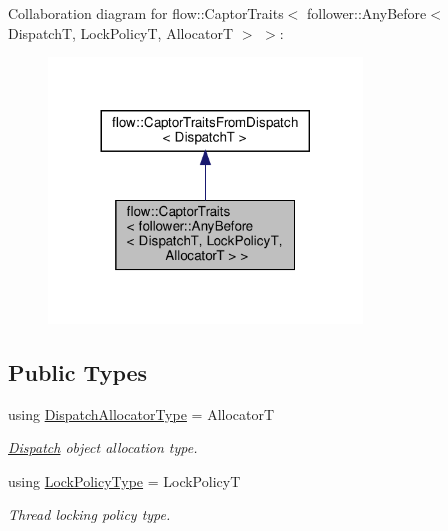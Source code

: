 Collaboration diagram for flow\+:\+:Captor\+Traits$<$ follower\+:\+:Any\+Before$<$ DispatchT, Lock\+PolicyT, AllocatorT $>$ $>$\+:\nopagebreak
\begin{figure}[H]
\begin{center}
\leavevmode
\includegraphics[width=236pt]{structflow_1_1_captor_traits_3_01follower_1_1_any_before_3_01_dispatch_t_00_01_lock_policy_t_00_2f7d1c83db67b38d8b297b11611292a1}
\end{center}
\end{figure}
\subsection*{Public Types}
\begin{DoxyCompactItemize}
\item 
\mbox{\label{structflow_1_1_captor_traits_3_01follower_1_1_any_before_3_01_dispatch_t_00_01_lock_policy_t_00_01_allocator_t_01_4_01_4_a3af70e51a0d14f66965be23affacd6e6}} 
using \hyperlink{structflow_1_1_captor_traits_3_01follower_1_1_any_before_3_01_dispatch_t_00_01_lock_policy_t_00_01_allocator_t_01_4_01_4_a3af70e51a0d14f66965be23affacd6e6}{Dispatch\+Allocator\+Type} = AllocatorT
\begin{DoxyCompactList}\small\item\em \hyperlink{classflow_1_1_dispatch}{Dispatch} object allocation type. \end{DoxyCompactList}\item 
\mbox{\label{structflow_1_1_captor_traits_3_01follower_1_1_any_before_3_01_dispatch_t_00_01_lock_policy_t_00_01_allocator_t_01_4_01_4_a4acfaf7b636514adcc88b31c75d92ff8}} 
using \hyperlink{structflow_1_1_captor_traits_3_01follower_1_1_any_before_3_01_dispatch_t_00_01_lock_policy_t_00_01_allocator_t_01_4_01_4_a4acfaf7b636514adcc88b31c75d92ff8}{Lock\+Policy\+Type} = Lock\+PolicyT
\begin{DoxyCompactList}\small\item\em Thread locking policy type. \end{DoxyCompactList}\end{DoxyCompactItemize}


